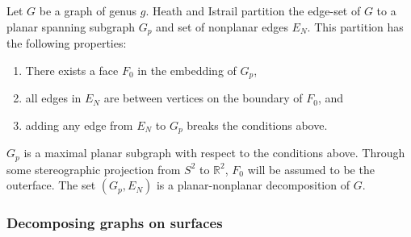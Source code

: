 Let $G$ be a graph of genus $g$.
Heath and Istrail partition the edge-set of \(G\) to a planar spanning subgraph \(G_p\) and set of nonplanar edges $E_N$. This partition has the following properties:
\begin{enumerate}
	\item There exists a face $F_0$ in the embedding of $G_p$,
	\item all edges in \(E_N\) are between vertices on the boundary of $F_0$, and
	\item adding any edge from $E_N$ to \(G_p\) breaks the conditions above.
\end{enumerate}
$G_p$ is a maximal planar subgraph with respect to the conditions above. Through some stereographic projection from $S^2$ to $\mathbb{R}^2$, $F_0$ will be assumed to be the outerface. The set $(G_p, E_N)$ is a planar-nonplanar decomposition of $G$. 



\subsubsection{Decomposing graphs on surfaces}\label{sssec:Planar_nonplanar_decomp}

